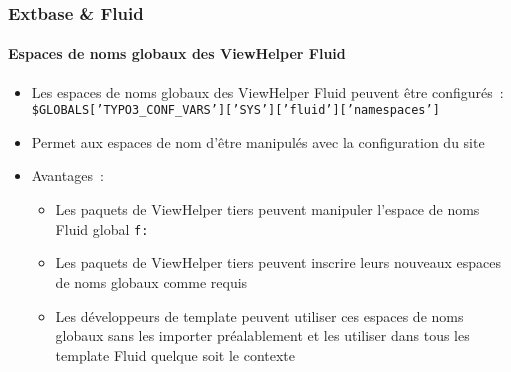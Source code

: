 \begin{frame}[fragile]
	\frametitle{Extbase \& Fluid}
	\framesubtitle{Espaces de noms globaux des ViewHelper Fluid}

	\begin{itemize}
		\item Les espaces de noms globaux des ViewHelper Fluid peuvent être configurés~:\newline
			\smaller
				\texttt{\$GLOBALS['TYPO3\_CONF\_VARS']['SYS']['fluid']['namespaces']}
			\normalsize
		\item Permet aux espaces de nom d'être manipulés avec la configuration du site
		\item Avantages~:

			\begin{itemize}
				\item Les paquets de ViewHelper tiers peuvent manipuler l'espace de noms
					Fluid global \texttt{f:}
				\item Les paquets de ViewHelper tiers peuvent inscrire leurs nouveaux
					espaces de noms globaux comme requis
				\item Les développeurs de template peuvent utiliser ces espaces de noms globaux
					sans les importer préalablement et les utiliser dans tous les template Fluid
					quelque soit le contexte
			\end{itemize}

	\end{itemize}

\end{frame}


